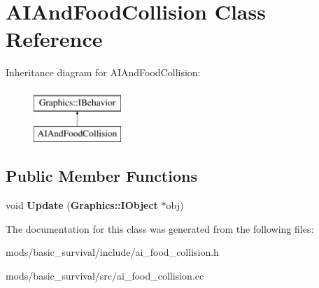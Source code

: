 \section{A\+I\+And\+Food\+Collision Class Reference}
\label{class_a_i_and_food_collision}
Inheritance diagram for A\+I\+And\+Food\+Collision\+:\begin{figure}[H]
\begin{center}
\leavevmode
\includegraphics[height=2.000000cm]{class_a_i_and_food_collision}
\end{center}
\end{figure}
\subsection*{Public Member Functions}
\begin{DoxyCompactItemize}
\item 
void {\bfseries Update} ({\bf Graphics\+::\+I\+Object} $\ast$obj)\label{class_a_i_and_food_collision_a7abb2f65d26c627aabf37a7ff3f4e12f}

\end{DoxyCompactItemize}


The documentation for this class was generated from the following files\+:\begin{DoxyCompactItemize}
\item 
mods/basic\+\_\+survival/include/ai\+\_\+food\+\_\+collision.\+h\item 
mods/basic\+\_\+survival/src/ai\+\_\+food\+\_\+collision.\+cc\end{DoxyCompactItemize}

